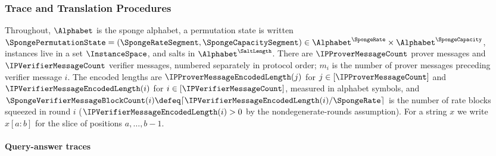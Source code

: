 \subsubsection{Trace and Translation Procedures}
\label{sec:dsfs_main_lemma_traces}

Throughout, \(\Alphabet\) is the sponge alphabet, a permutation state is written \(\SpongePermutationState = (\SpongeRateSegment, \SpongeCapacitySegment) \in \Alphabet^{\SpongeRate} \times \Alphabet^{\SpongeCapacity}\), instances live in a set \(\InstanceSpace\), and salts in \(\Alphabet^{\SaltLength}\). There are \(\IPProverMessageCount\) prover messages and \(\IPVerifierMessageCount\) verifier messages, numbered separately in protocol order; \(m_i\) is the number of prover messages preceding verifier message \(i\). The encoded lengths are \(\IPProverMessageEncodedLength(j)\) for \(j\in[\IPProverMessageCount]\) and \(\IPVerifierMessageEncodedLength(i)\) for \(i\in[\IPVerifierMessageCount]\), measured in alphabet symbols, and \(\SpongeVerifierMessageBlockCount(i) \defeq \lceil \IPVerifierMessageEncodedLength(i) / \SpongeRate \rceil\) is the number of rate blocks squeezed in round \(i\) (\(\IPVerifierMessageEncodedLength(i) > 0\) by the nondegenerate-rounds assumption). For a string \(x\) we write \(x[a{:}b]\) for the slice of positions \(a, \dots, b-1\).

\paragraph{Query-answer traces}

